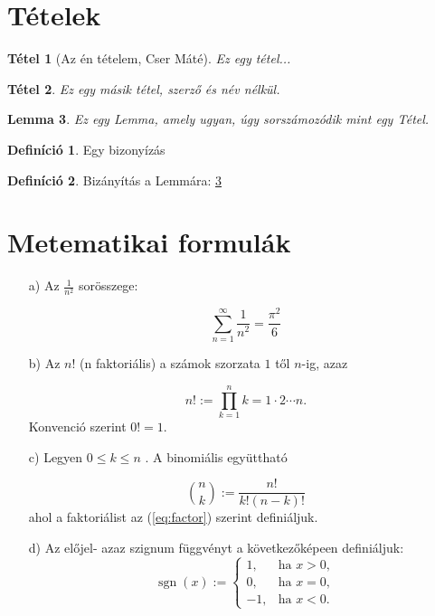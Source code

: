 \documentclass{article}
\author{Cser Máté}
\newtheorem{theorem}{Tétel}
\newtheorem{lemma}[theorem]{Lemma}
\theoremstyle{definition} %
\newtheorem{definition}{Definíció}
\begin{document}
\section{Tételek}
\begin{theorem}[Az én tételem, Cser Máté]
	Ez egy tétel...
\end{theorem}

\begin{theorem}
	Ez egy másik tétel, szerző és név nélkül.
\end{theorem}

\begin{lemma} \label{lem:lemma1}
	Ez egy Lemma, amely ugyan, úgy sorszámozódik mint egy Tétel.
\end{lemma}

\begin{definition}
	Egy bizonyízás
\end{definition}

\begin{definition}
	Bizányítás a Lemmára: \ref{lem:lemma1}
\end{definition}

\section{Metematikai formulák}
\begin{enumerate}
	\item[a)] Az $\frac{1}{n^2}$ sorösszege:

	\begin{equation}
		\sum_{n=1}^{\infty} \frac{1}{n^2} = \frac{\pi^2}{6}
	\end{equation}

	\item[b)] Az $n!$ (n faktoriális) a számok szorzata $1$ től $n$-ig, azaz
	
	\begin{equation}\label{eq:factor}
		n! := \prod_{k=1}^{n} k = 1\cdot 2 \cdots n.
	\end{equation}
	\noindent Konvenció szerint $0! = 1$.

	\item[c)] Legyen $0 \leq k \leq n$ . A binomiális együttható
	
	\begin{equation}
		\binom{n}{k} := \frac{n!}{k!(n-k)!}
	\end{equation}
	\noindent ahol a faktoriálist az (\ref{eq:factor}) szerint definiáljuk.

	\item[d)] Az előjel- azaz szignum függvényt a következőképeen definiáljuk:
	\begin{equation}
		\operatorname{sgn}(x) := \begin{cases}
			1, & \text{ha } x > 0, \\
			0, & \text{ha } x = 0, \\
			-1, & \text{ha } x < 0.
		\end{cases}
	\end{equation}
\end{enumerate}
\end{document}
